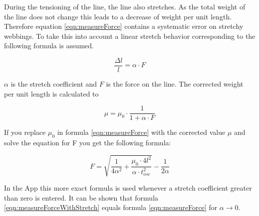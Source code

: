 During the tensioning of the line, the line also stretches. As the total weight of the line does not change this leads to a decrease of weight per unit length. Therefore equation \ref{eqn:measureForce} contains a systematic error on stretchy webbings. To take this into account a linear stretch behavior corresponding to the following formula is assumed.

\begin{equation}
	\frac{\Delta l}{l} = \alpha \cdot F
\end{equation}

$\alpha$ is the stretch coefficient and $F$ is the force on the line. The corrected weight per unit length is calculated to

\begin{equation}
	\mu = \mu_0 \cdot \frac{1}{1+\alpha\cdot F}
\end{equation}

If you replace $\mu_0$ in formula \ref{eqn:measureForce} with the corrected value $\mu$ and solve the equation for F you get the following formula:

\begin{equation}
	F = \sqrt{\frac{1}{4 \alpha^2} + \frac{\mu_0\cdot 4l^2}{\alpha \cdot t_{osc}^2}} - \frac{1}{2\alpha}
	\label{eqn:measureForceWithStretch}
\end{equation}

In the App this more exact formula is used whenever a stretch coefficient greater than zero is entered.
It can be shown that formula \ref{eqn:measureForceWithStretch} equals formula \ref{eqn:measureForce} for $\alpha\rightarrow 0$.
